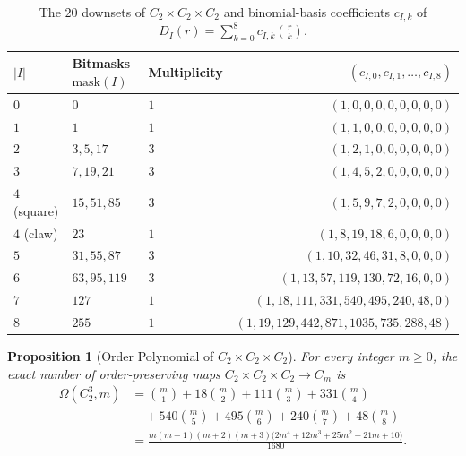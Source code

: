 \documentclass[11pt,a4paper]{article}
\newtheorem{proposition}[theorem]{Proposition}
\theoremstyle{definition}
\begin{document}
\begin{table}[ht]
\centering
\caption{The $20$ downsets of $C_2 \times C_2 \times C_2$ and binomial-basis coefficients
$c_{I,k}$ of $D_I(r) = \sum_{k=0}^8 c_{I,k}\binom{r}{k}$.}\label{tab:cube-ideals}
\smallskip
\begin{tabular}{@{}lllr@{}}
\toprule
$|I|$ & Bitmasks $\mathrm{mask}(I)$ & Multiplicity & $(c_{I,0}, c_{I,1}, \dots, c_{I,8})$ \\
\midrule
$0$ & $0$              & $1$ & $(1, 0, 0, 0, 0, 0, 0, 0, 0)$ \\
$1$ & $1$              & $1$ & $(1, 1, 0, 0, 0, 0, 0, 0, 0)$ \\
$2$ & $3, 5, 17$       & $3$ & $(1, 2, 1, 0, 0, 0, 0, 0, 0)$ \\
$3$ & $7, 19, 21$      & $3$ & $(1, 4, 5, 2, 0, 0, 0, 0, 0)$ \\
$4$ (square) & $15, 51, 85$ & $3$ & $(1, 5, 9, 7, 2, 0, 0, 0, 0)$ \\
$4$ (claw)   & $23$    & $1$ & $(1, 8, 19, 18, 6, 0, 0, 0, 0)$ \\
$5$ & $31, 55, 87$     & $3$ & $(1, 10, 32, 46, 31, 8, 0, 0, 0)$ \\
$6$ & $63, 95, 119$    & $3$ & $(1, 13, 57, 119, 130, 72, 16, 0, 0)$ \\
$7$ & $127$            & $1$ & $(1, 18, 111, 331, 540, 495, 240, 48, 0)$ \\
$8$ & $255$            & $1$ & $(1, 19, 129, 442, 871, 1035, 735, 288, 48)$ \\
\bottomrule
\end{tabular}
\end{table}

\begin{proposition}[Order Polynomial of $C_2 \times C_2 \times C_2$]\label{prop:omega-cube}
For every integer $m \ge 0$, the exact number of order-preserving maps $C_2 \times C_2 \times C_2
\to C_m$ is
\begin{align}
  \Omega(C_2^3, m)
  &= \binom{m}{1} + 18\binom{m}{2} + 111\binom{m}{3} + 331\binom{m}{4} \nonumber \\
  &\quad + 540\binom{m}{5} + 495\binom{m}{6} + 240\binom{m}{7} + 48\binom{m}{8}
     \label{eq:omega-cube-binom} \\
  &= \frac{m(m+1)(m+2)(m+3)\bigl(2m^4 + 12m^3 + 25m^2 + 21m + 10\bigr)}{1680}.
     \label{eq:omega-cube-factored}
\end{align}
\end{proposition}
\end{document}
